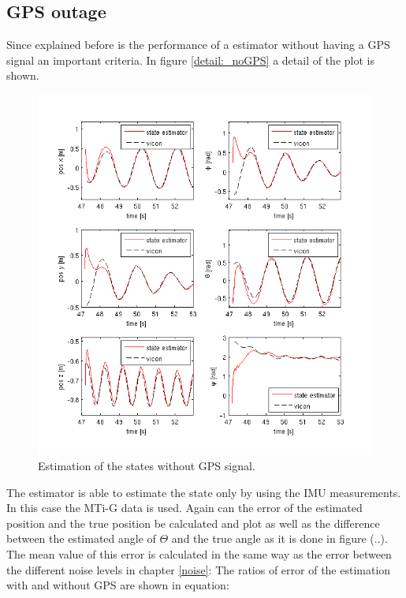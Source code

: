 \subsection{GPS outage}\label{no_GPS}
Since explained before is the performance of a estimator without having a GPS signal an important criteria. In figure \ref{detail:_noGPS} a detail of the plot is shown.
\begin{figure}[h]
\centering
\includegraphics[width=1\textwidth]{pictures/2_2_detail_noGPS.png}
\caption{Estimation of the states without GPS signal.}
\label{detail_noGPS}
\end{figure}
The estimator is able to estimate the state only by using the IMU measurements. In this case the MTi-G data is used. Again can the error of the estimated position and the true position be calculated and plot as well as the difference between the estimated angle of $\Theta$ and the true angle as it is done in figure (..). The mean value of this error is calculated in the same way as the error between the different noise levels in chapter \ref{noise}: The ratios of error of the estimation with and without GPS are shown in equation:
